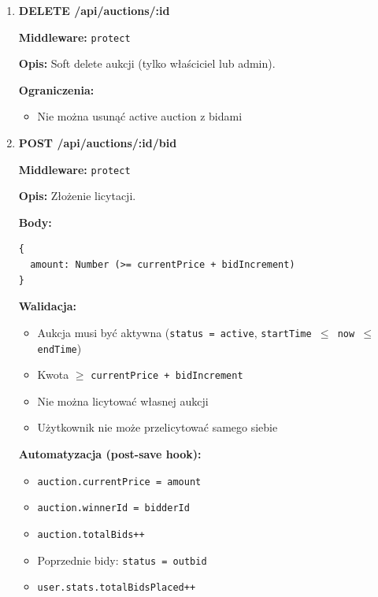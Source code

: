\begin{enumerate}
        \textbf{Błędy:}
        \begin{itemize}
          \item \texttt{403} --- Brak uprawnień (nie właściciel)
          \item \texttt{400} --- Edycja aktywnej aukcji z bidami zabroniona
          \item \texttt{404} --- Aukcja nie znaleziona
        \end{itemize}

  \item \textbf{DELETE /api/auctions/:id}

        \textbf{Middleware:} \texttt{protect}

        \textbf{Opis:} Soft delete aukcji (tylko właściciel lub admin).

        \textbf{Ograniczenia:}
        \begin{itemize}
          \item Nie można usunąć active auction z bidami
        \end{itemize}

  \item \textbf{POST /api/auctions/:id/bid}

        \textbf{Middleware:} \texttt{protect}

        \textbf{Opis:} Złożenie licytacji.

        \textbf{Body:}
        \begin{lstlisting}
{
  amount: Number (>= currentPrice + bidIncrement)
}
\end{lstlisting}

        \textbf{Walidacja:}
        \begin{itemize}
          \item Aukcja musi być aktywna (\texttt{status = active}, \texttt{startTime $\leq$ now $\leq$ endTime})
          \item Kwota $\geq$ \texttt{currentPrice + bidIncrement}
          \item Nie można licytować własnej aukcji
          \item Użytkownik nie może przelicytować samego siebie
        \end{itemize}

        \textbf{Automatyzacja (post-save hook):}
        \begin{itemize}
          \item \texttt{auction.currentPrice = amount}
          \item \texttt{auction.winnerId = bidderId}
          \item \texttt{auction.totalBids++}
          \item Poprzednie bidy: \texttt{status = outbid}
          \item \texttt{user.stats.totalBidsPlaced++}
        \end{itemize}


\end{enumerate}
